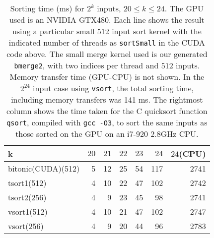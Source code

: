 

\begin{table}
\begin{center}
  \begin{tabular}{| l | r | r | r | r | r | r | }
    \hline
        k                             &  $20$ &  $21$ & $22$& $23$ & $24$ & $24$(CPU)  \\ \hline
    bitonic(CUDA)(512)                &  5 & 12 & 25 & 54 & 117 & 2741   \\      
    tsort1(512)                       &  4 & 10 & 22 & 47 & 102 & 2742    \\
    tsort2(256)                       &  4 & 9 & 23 & 45 & 98 & 2741     \\ 
    vsort1(512)                       &  4 & 10 & 21 & 47 & 102 & 2747    \\ 
    vsort(256)                        &  4 & 9 & 20 & 44 & 96 & 2783    \\ 
    \hline
  \end{tabular}
\end{center}
\label{tab:expressive-table1}
\caption{Sorting time (ms) for $2^k$ inputs, $20 \leq k \leq 24$.  The GPU used is an NVIDIA GTX480.
Each line shows the result using a particular small $512$ input sort kernel with the
indicated number of threads as {\tt sortSmall} in the CUDA code above. The small merge kernel used
is our generated {\tt bmerge2}, with two indices per thread and $512$ inputs. Memory transfer time (GPU-CPU)
is not shown. In the $2^{24}$ input case using {\tt vsort}, the total sorting time, including
memory transfers was 141 ms.
The rightmost column shows the time taken for the C quicksort function {\tt qsort}, compiled with
{\tt gcc -O3}, to sort the same inputs as those sorted on the GPU on an i7-920 2.8GHz CPU.
} 
\end{table}




